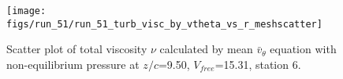 \begin{figure}[H]
\centering
\texttt{[image: figs/run\_51/run\_51\_turb\_visc\_by\_vtheta\_vs\_r\_meshscatter]}
\caption{Scatter plot of total viscosity $\nu$ calculated by mean $\bar{v}_{\theta}$ equation with non-equilibrium pressure at $z/c$=9.50, $V_{free}$=15.31, station 6.}
\label{fig:run_51_turb_visc_by_vtheta_vs_r_meshscatter}
\end{figure}



